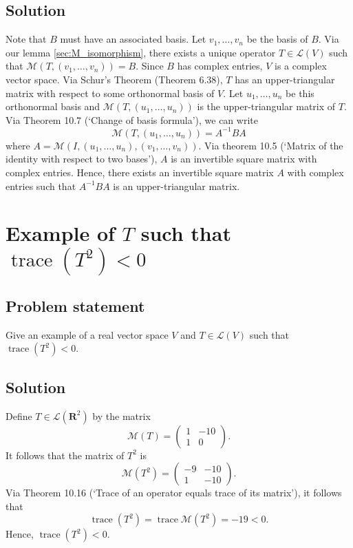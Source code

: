 \documentclass{article}
\begin{document}
\subsection*{Solution}
Note that $B$ must have an associated basis. 
Let $v_1,\ldots,v_n$ be the basis of $B$. 
Via our lemma \ref{sec:M_isomorphism}, there exists a unique operator $T\in\mathcal{L}(V)$ such that $\mathcal{M}(T, (v_1,\ldots,v_n))=B$. 
Since $B$ has complex entries, $V$ is a complex vector space. 
Via Schur's Theorem (Theorem 6.38), $T$ has an upper-triangular matrix with respect to some orthonormal basis of $V$. 
Let $u_1,\ldots,u_n$ be this orthonormal basis and $\mathcal{M}(T,(u_1,\ldots,u_n))$ is the upper-triangular matrix of $T$. 
Via Theorem 10.7 (`Change of basis formula'), we can write
\[\mathcal{M}(T,(u_1,\ldots,u_n))=A^{-1}BA\]
where $A=\mathcal{M}(I,(u_1,\ldots,u_n),(v_1,\ldots,v_n))$. 
Via theorem 10.5 (`Matrix of the identity with respect to two bases'), $A$ is an invertible square matrix with complex entries. 
Hence, there exists an invertible square matrix $A$ with complex entries such that $A^{-1}BA$ is an upper-triangular matrix.

\clearpage

\section{Example of $T$ such that $\operatorname{trace}(T^2)<0$}
\subsection*{Problem statement}
Give an example of a real vector space $V$ and $T\in\mathcal{L}(V)$ such that $\operatorname{trace}(T^2)<0$.

\subsection*{Solution}
Define $T\in\mathcal{L}(\mathbf{R}^2)$ by the matrix
\begin{equation*}
    \mathcal{M}(T)=
    \begin{pmatrix}
    1 & -10\\
    1 & 0
    \end{pmatrix}.
\end{equation*}
It follows that the matrix of $T^2$ is
\begin{equation*}
    \mathcal{M}(T^2)=
    \begin{pmatrix}
    -9 & -10\\
    1 & -10
    \end{pmatrix}.
\end{equation*}
Via Theorem 10.16 (`Trace of an operator equals trace of its matrix'), it follows that
\[\operatorname{trace}(T^2)=\operatorname{trace}\mathcal{M}(T^2)=-19<0.\]
Hence, $\operatorname{trace}(T^2)<0$.
\end{document}
